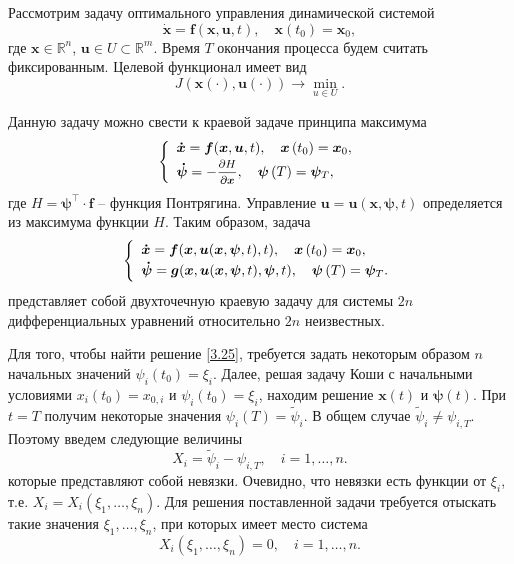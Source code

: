 \documentclass[a4paper,12pt, openany]{book}
\theoremstyle{plain} %
\theoremstyle{definition} %
\theoremstyle{remark} %
\numberwithin{equation}{chapter}
\begin{document}
{Рассмотрим задачу оптимального управления динамической системой \cite{Moiseev} 
\begin{equation}\label{3.22}
\bm {\dot x} = \bm f(\bm x,\bm u,t), \quad \bm x(t_0) = \bm x_0,
\end{equation}
где $\bm x\in \mathbb{R}^n$, $\bm u\in U \subset \mathbb{R}^m$. Время $T$ окончания процесса будем считать фиксированным. Целевой функционал имеет вид 
\begin{equation}\label{3.23}
J\left( {\bm x\left(  \cdot  \right),\bm u\left(  \cdot  \right)} \right) \to \mathop {\min }\limits_{u \in U} .
\end{equation}

Данную задачу можно свести к краевой задаче принципа максимума
\begin{equation}\label{3.24}
\left\{ {\begin{array}{*{20}l}
   {\bm {\dot x} = \bm f(\bm x,\bm u,t), \quad \bm x\left( t_0 \right) = \bm x_0 ,} \hfill  \\ [2pt]
   {\bm {\dot \psi}  =  - \mfrac{{\partial H}}
{{\partial \bm x}}, \quad \bm \psi \left( T \right) = \bm \psi _T,} \hfill  \\
 \end{array} } \right.
\end{equation}
где $H = \bm\psi^\top \cdot\bm f$ -- функция Понтрягина. Управление $\bm u = \bm u(\bm x, \bm \psi, t)$ определяется из максимума функции $H$. Таким образом, задача
\begin{equation}\label{3.25}
\left\{ {\begin{array}{*{20}l}
   {\bm {\dot x} = \bm f(\bm x,\bm u(\bm x, \bm \psi, t),t), \quad \bm x\left( t_0 \right) = \bm x_0 ,} \hfill  \\ [2pt]
   {\bm {\dot \psi}  =  \bm g(\bm x, \bm u(\bm x, \bm \psi, t),\bm \psi, t), \quad \bm \psi \left( T \right) = \bm \psi _T.} \hfill  \\
 \end{array} } \right.
\end{equation}
представляет собой двухточечную краевую задачу для системы $2n$ дифференциальных уравнений относительно $2n$ неизвестных. 

Для того, чтобы найти решение \eqref{3.25}, требуется задать некоторым образом $n$ начальных значений $\psi_i(t_0) = \xi_i$. Далее, решая задачу Коши с начальными условиями $x_i(t_0) = x_{0,i}$ и $\psi_i(t_0) = \xi_i$, находим решение $\bm x(t)$ и $\bm\psi(t)$. При $t=T$ получим некоторые значения $\psi_i(T) = \tilde\psi_i$. В общем случае $\tilde\psi_i \neq \psi_{i,T}$. Поэтому введем следующие величины
\begin{equation}\label{3.26}
X_i  = \tilde \psi _i  - \psi _{i,T}, \quad i = 1,\ldots,n.
\end{equation}
которые представляют собой невязки. Очевидно, что невязки есть функции от $\xi_i$, т.е. $X_i = X_i(\xi_1,\ldots,\xi_n)$. Для решения поставленной задачи требуется отыскать такие значения $\xi_1,\ldots, \xi_n$, при которых имеет место система 
\begin{equation}\label{3.27}
X_i(\xi_1,\ldots,\xi_n) = 0, \quad i = 1,\ldots,n.
\end{equation}

}
\end{document}
